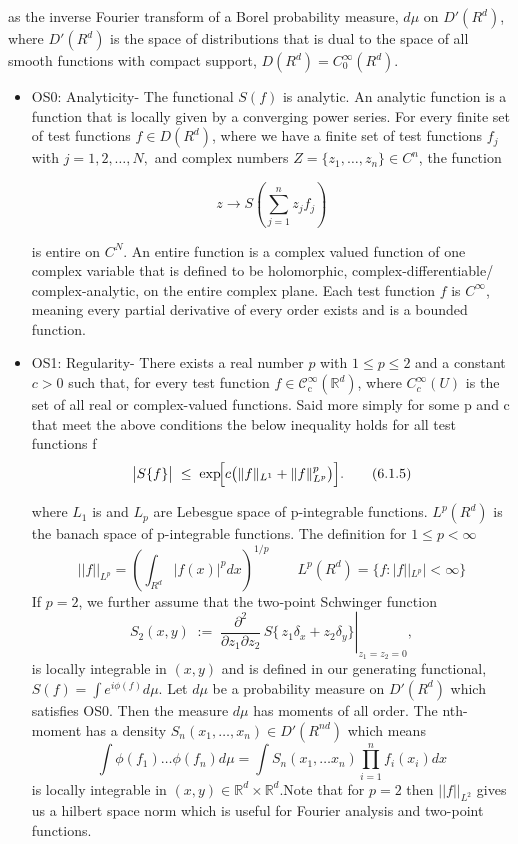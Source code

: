 \documentclass{article}
\newcommand{\1}{\mathbbm{1}}
\theoremstyle{plain}
\theoremstyle{definition}
\numberwithin{equation}{section}
\begin{document}
as the inverse Fourier transform of a Borel probability measure, $d\mu$ on $D'(R^d)$, where  $D'(R^d)$ is the space of distributions that is dual to the space of all smooth functions with compact support, $D(R^d)= C_0^{\infty} (R^d)$. 
\begin{itemize}
    \item OS0: Analyticity- The functional $S (f) $ is analytic. An analytic function is a function that is locally given by a converging power series. For every finite set of test functions $f \in D({R^d})$,  where we have a finite set of test functions $f_j$ with $j= 1,2, \ldots, N, $ and complex numbers $Z = \{ z_1, \ldots, z_n\} \in C^n$, the function 

\begin{equation}
    z \rightarrow S (\sum_{j=1}^n  z_j f_j )
\end{equation}

is entire on $C^N$. An entire function is a complex valued function of one complex variable that is defined to be holomorphic, complex-differentiable/ complex-analytic, on the entire complex plane. Each test function $f$ is $C^{\infty}$, meaning every partial derivative of every order exists and is a bounded function. 

    
    \item OS1: Regularity-
There exists a real number \(p\) with \(1\le p\le 2\) and a constant \(c>0\) such that, for every test function \(f\in\mathcal{C}^{\infty}_{\mathrm c}(\mathbb{R}^{d})\), where $C_c^{\infty} (U)$ is the set of all real or complex-valued functions. Said more simply for some p and c that meet the above conditions the below inequality holds for all test functions f
\begin{equation}\label{eq:OS1}
\bigl|S\{f\}\bigr|
\;\le\;
\exp\!\Bigl[c\bigl(\|f\|_{L^{1}}+\|f\|_{L^{p}}^p\bigr)\Bigr].
\tag{6.1.5}
\end{equation}

where $L_1$ is and $L_p$ are Lebesgue space of p-integrable functions. $L^p(R^d)$ is the banach space of p-integrable functions. The definition for $1 \leq p < \infty$ 
\begin{equation}
    || f ||_{L^p}= (\int_{R^d} |f(x)|^p dx)^{1/p} \qquad L^p(R^d)= \{f: |f||_{L^p}| < \infty \}
\end{equation}
If \(p=2\), we further assume that the two‑point Schwinger function
\[
S_{2}(x,y)\;:=\;
\left.\frac{\partial^{2}}{\partial z_{1}\partial z_{2}}\,
S\!\bigl\{\,z_{1}\delta_{x}+z_{2}\delta_{y}\bigr\}\right|_{z_{1}=z_{2}=0},
\]
is locally integrable in $(x,y)$ and is defined in our generating functional, $S(f) = \int e^{i \phi(f)} d \mu$. Let $d \mu$ be a probability measure on $D'(R^d)$ which satisfies OS0. Then the measure $d\mu$ has moments of all order. The nth-moment has a density $S_n(x_1, \ldots, x_n) \in D'(R^{nd})$ which means 
\begin{equation}
    \int \phi(f_1) \ldots \phi(f_n) d \mu = \int S_{n}(x_1, \ldots x_n) \prod_{i=1}^n f_i (x_i) dx 
\end{equation}
is locally integrable in \((x,y)\in\mathbb{R}^{d}\times\mathbb{R}^{d}\).Note that for $p=2$ then $||f||_{L^2}$ gives us a hilbert space norm which is useful for Fourier analysis and two-point functions. 


\end{itemize}
\end{document}
